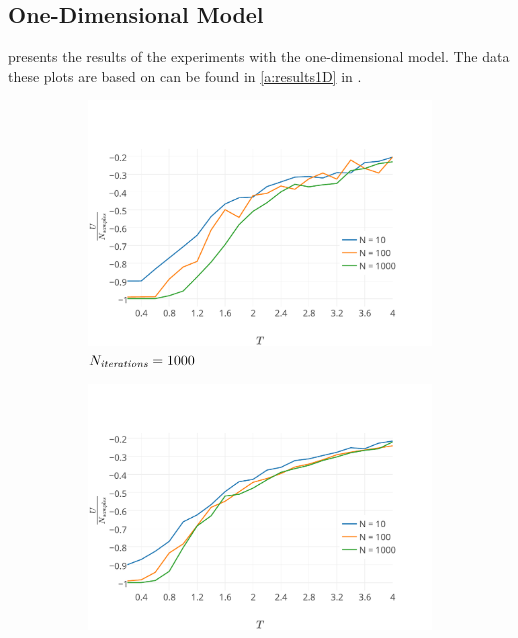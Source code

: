 
\subsection{One-Dimensional Model}
	 presents the results of the experiments with the one-dimensional model. The data these plots are based on can be found in \cref{a:results1D} in .

	\begin{figure}
		\centering
		\begin{subfigure}{\columnwidth}
			\centering
			\includegraphics[width=\textwidth, keepaspectratio=true]{img/1D/1DaverageEnergyN1000.pdf}
			\caption{$N_\textit{iterations} = 1000$}
			\label{fig:results:1D:U:1000}
		\end{subfigure}
		\begin{subfigure}{\columnwidth}
			\centering
			\includegraphics[width=\textwidth, keepaspectratio=true]{img/1D/1DaverageEnergyN10000.pdf}

\end{subfigure}
\end{figure}
